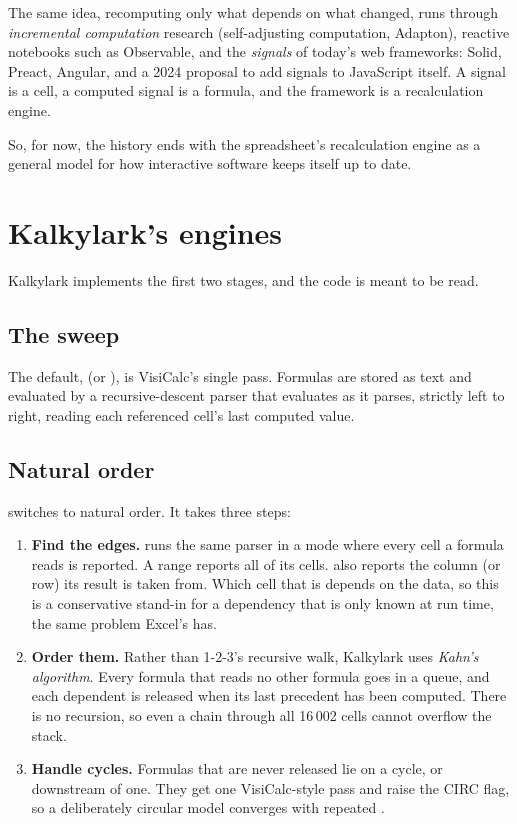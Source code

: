 \documentclass[11pt]{article}
\begin{document}
The same idea, recomputing only what depends on what changed, runs through
\emph{incremental computation} research (self-adjusting computation,
Adapton), reactive notebooks such as Observable, and the \emph{signals} of
today's web frameworks: Solid, Preact, Angular, and a 2024 proposal to add
signals to JavaScript itself. A signal is a cell, a computed signal is a
formula, and the framework is a recalculation engine.

So, for now, the history ends with the spreadsheet's recalculation engine as
a general model for how interactive software keeps itself up to date.

\section{Kalkylark's engines}

Kalkylark implements the first two stages, and the code is meant to be
read.

\subsection{The sweep}

The default,  (or ), is VisiCalc's single pass.
Formulas are stored as text and evaluated by a recursive-descent parser
that evaluates as it parses, strictly left to right, reading each
referenced cell's last computed value.

\subsection{Natural order}

 switches to natural order. It takes three steps:

\begin{enumerate}[label=\arabic*.]
\item \textbf{Find the edges.}  runs the same parser
  in a mode where every cell a formula reads is reported. A range reports
  all of its cells.  also reports the column (or row) its
  result is taken from. Which cell that is depends on the data, so this is
  a conservative stand-in for a dependency that is only known at run time,
  the same problem Excel's  has.
\item \textbf{Order them.} Rather than 1-2-3's recursive walk, Kalkylark
  uses \emph{Kahn's algorithm}. Every formula that reads no other formula
  goes in a queue, and each dependent is released when its last precedent
  has been computed. There is no recursion, so even a chain through all
  16\,002 cells cannot overflow the stack.
\item \textbf{Handle cycles.} Formulas that are never released lie on a
  cycle, or downstream of one. They get one VisiCalc-style pass and raise
  the \textsf{CIRC} flag, so a deliberately circular model converges with
  repeated \typ{!}.
\end{enumerate}
\end{document}
